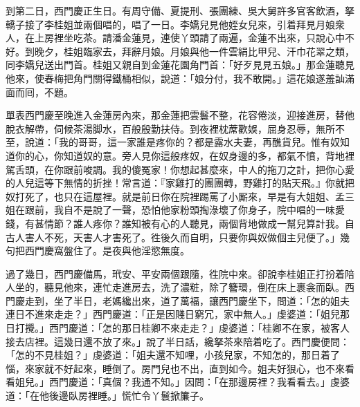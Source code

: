 到第二日，西門慶正生日。有周守備、夏提刑、張團練、吳大舅許多官客飲酒，拏轎子接了李桂姐並兩個唱的，唱了一日。李嬌兒見他姪女兒來，引着拜見月娘衆人，{}在上房裡坐吃茶。請潘金蓮見，連使丫頭請了兩遍，金蓮不出來，只說心中不好。到晚夕，桂姐臨家去，拜辭月娘。月娘與他一件雲絹比甲兒、汗巾花翠之類，同李嬌兒送出門首。桂姐又親自到金蓮花園角門首：「好歹見見五娘。」{}那金蓮聽見他來，使春梅把角門關得鐵桶相似，說道：「娘分付，我不敢開。」這花娘遂羞訕滿面而囘，{}不題。

單表西門慶至晚進入金蓮房內來，那金蓮把雲鬟不整，花容倦淡，{}迎接進房，替他脫衣解帶，伺候茶湯脚水，百般殷勤扶侍。到夜裡枕蓆歡娛，屈身忍辱，無所不至，說道：「我的哥哥，這一家誰是疼你的？都是露水夫妻，再醮貨兒。惟有奴知道你的心，你知道奴的意。旁人見你這般疼奴，在奴身邊的多，都氣不憤，背地裡駕舌頭，在你跟前唆調。我的傻冤家！你想起甚麼來，中人的拖刀之計，把你心愛的人兒這等下無情的折挫！常言道：『家雞打的團團轉，野雞打的貼天飛。』你就把奴打死了，也只在這屋裡。{}就是前日你在院裡踢罵了小厮來，早是有大姐姐、孟三姐在跟前，我自不是說了一聲，恐怕他家粉頭掏淥壞了你身子，院中唱的一味愛錢，有甚情節？誰人疼你？誰知被有心的人聽見，兩個背地做成一幫兒算計我。自古人害人不死，天害人才害死了。徃後久而自明，只要你與奴做個主兒便了。」幾句把西門慶窩盤住了。是夜與他淫慾無度。

過了幾日，西門慶備馬，玳安、平安兩個跟隨，徃院中來。卻說李桂姐正打扮着陪人坐的，聽見他來，連忙走進房去，洗了濃粧，除了簪環，倒在床上裹衾而臥。{}西門慶走到，坐了半日，老媽纔出來，道了萬福，讓西門慶坐下，問道：「怎的姐夫連日不進來走走？」西門慶道：「正是因賤日窮冗，家中無人。」虔婆道：「姐兒那日打攪。」西門慶道：「怎的那日桂卿不來走走？」虔婆道：「桂卿不在家，被客人接去店裡。這幾日還不放了來。」說了半日話，纔拏茶來陪着吃了。西門慶便問：「怎的不見桂姐？」虔婆道：「姐夫還不知哩，小孩兒家，不知怎的，那日着了惱，來家就不好起來，睡倒了。房門兒也不出，直到如今。姐夫好狠心，也不來看看姐兒。」{}西門慶道：「真個？我通不知。」{}因問：「在那邊房裡？我看看去。」虔婆道：「在他後邊臥房裡睡。」慌忙令丫鬟掀簾子。

